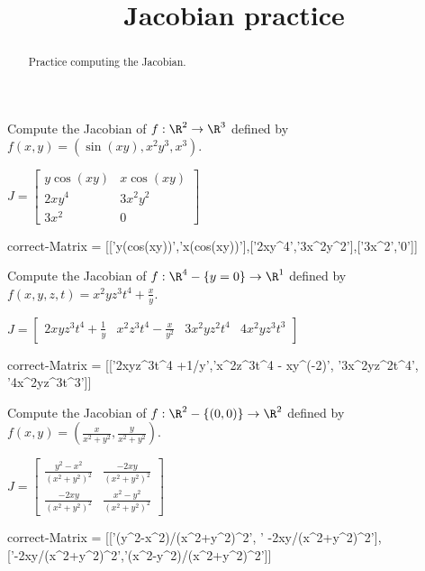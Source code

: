\documentclass{ximera}
\title{Jacobian practice}
\begin{document}
	\begin{abstract}
          Practice computing the Jacobian.
	\end{abstract}
	
	\begin{question}	
		Compute the Jacobian of $f:\R^2 \to \R^3$ defined by $f(x,y) = (\sin(xy),x^2y^3, x^3)$.
		\begin{solution}
		\begin{hint}
			\(J = \begin{bmatrix} y\cos(xy) & x\cos(xy) \\ 2xy^4 & 3x^2y^2 \\ 3x^2 & 0 \end{bmatrix}\)
		\end{hint}
		\begin{matrix-answer}[name=J]
			correct-Matrix  = [['y(cos(xy))','x(cos(xy))'],['2xy^4','3x^2y^2'],['3x^2','0']]
		\end{matrix-answer}
		\end{solution}
	\end{question}
	
	\begin{question}	
		Compute the Jacobian of $f:\R^4 - \{y=0\} \to \R^1$ defined by $f(x,y,z,t) = x^2yz^3t^4+\frac{x}{y}$.
		\begin{solution}
		\begin{hint}
			\(J = \begin{bmatrix} 2xyz^3t^4 +\frac{1}{y} & x^2z^3t^4 - \frac{x}{y^2} & 3x^2yz^2t^4 & 4x^2yz^3t^3\end{bmatrix}\)
		\end{hint}
		\begin{matrix-answer}[name=J]
			correct-Matrix  = [['2xyz^3t^4 +1/y','x^2z^3t^4 - xy^(-2)', '3x^2yz^2t^4', '4x^2yz^3t^3']]
		\end{matrix-answer}
		\end{solution}
	\end{question}
	
	\begin{question}	
		Compute the Jacobian of $f:\R^2 - \{(0,0)\} \to \R^2$ defined by $f(x,y) = (\frac{x}{x^2+y^2},\frac{y}{x^2+y^2})$.
		\begin{solution}
		\begin{hint}
			\(J = \begin{bmatrix} \frac{y^2-x^2}{(x^2+y^2)^2} & \frac{-2xy}{(x^2+y^2)^2} \\   \frac{-2xy}{(x^2+y^2)^2} & \frac{x^2-y^2}{(x^2+y^2)^2}  \end{bmatrix}\)
		\end{hint}
		\begin{matrix-answer}[name=J]
			correct-Matrix  = [['(y^2-x^2)/(x^2+y^2)^2', ' -2xy/(x^2+y^2)^2'],['-2xy/(x^2+y^2)^2','(x^2-y^2)/(x^2+y^2)^2']]
		\end{matrix-answer}
		\end{solution}
	\end{question}
	
\end{document}
